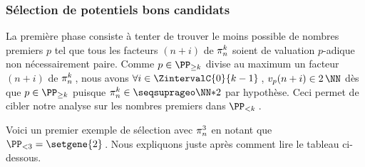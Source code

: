 \subsubsection{Sélection de potentiels bons candidats} \label{algos-used-select}

\leavevmode
\smallskip

La première phase consiste à tenter de trouver le moins possible de nombres premiers $p$ tel que tous les facteurs $(n+i)$ de $\consprod$ soient de valuation $p$-adique non nécessairement paire. 
Comme $p \in \PP_{\geq k}$ divise au maximum un facteur $(n+i)$ de $\consprod$\,, nous avons $\forall i \in \ZintervalC{0}{k-1}$\,, $\padicval{n+i} \in 2\,\NN$ dès que $p \in \PP_{\geq k}$ puisque  $\consprod \in \NNssquare$ par hypothèse. Ceci permet de cibler notre analyse sur les nombres premiers dans $\PP_{< k}$\,. 




\medskip

Voici un premier exemple de sélection avec $\consprod<3>$ en notant que $\PP_{< 3} = \setgene{2}$\,. Nous expliquons juste après comment lire le tableau ci-dessous.


\begin{center}
\end{center}

